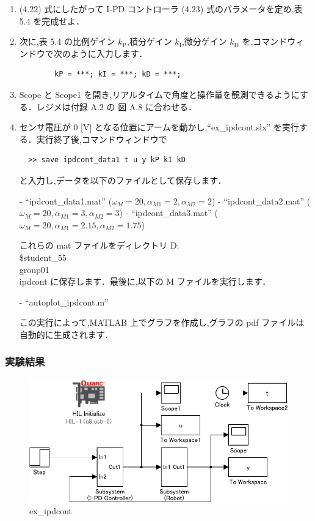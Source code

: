 \begin{enumerate}
  \item (4.22) 式にしたがって I-PD コントローラ (4.23) 式のパラメータを定め,表 5.4 を完成せよ．
        
  \item 次に,表 5.4 の比例ゲイン $k_{\mathrm{P}}$,積分ゲイン $k_{\mathrm{I}}$,微分ゲイン $k_{\mathrm{D}}$ を,コマンドウィンドウで次のように入力します．
        \begin{verbatim}
        kP = ***; kI = ***; kD = ***;
        \end{verbatim}
        
  \item Scope と Scope1 を開き,リアルタイムで角度と操作量を観測できるようにする．レジメは付録 A.2 の 図 A.8 に合わせる．
        
  \item センサ電圧が 0 [V] となる位置にアームを動かし,“ex\_ipdcont.slx” を実行する．実行終了後,コマンドウィンドウで
        \begin{verbatim}
  >> save ipdcont_data1 t u y kP kI kD
  \end{verbatim}
        と入力し,データを以下のファイルとして保存します．
        
        - “ipdcont\_data1.mat” ($\omega_M = 20, \alpha_{M1} = 2, \alpha_{M2} = 2$)
        - “ipdcont\_data2.mat” ($\omega_M = 20, \alpha_{M1} = 3, \alpha_{M2} = 3$)
        - “ipdcont\_data3.mat” ($\omega_M = 20, \alpha_{M1} = 2.15, \alpha_{M2} = 1.75$)
        
        これらの mat ファイルをディレクトリ D:\\\$student\_55\\group01\\ipdcont に保存します．最後に,以下の M ファイルを実行します．
        
        - “autoplot\_ipdcont.m”
        
        この実行によって,MATLAB 上でグラフを作成し,グラフの pdf ファイルは自動的に生成されます．
\end{enumerate}

\subsubsection{実験結果}
\begin{figure}[h]
  \centering
  \includegraphics[scale=1]{sozai/ex_ipdcont-crop.pdf}
  \caption{ex\_ipdcont}
\end{figure}

